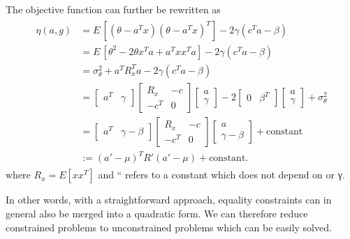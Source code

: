 \documentclass[letterpaper,10pt,english]{jupyterBook}
\begin{document}
\sphinxAtStartPar
The objective function can further be rewritten as
\begin{equation*}
\begin{split} \begin{split} \eta(a,g) & = E\, \left[\left(\theta - a^T
x\right)\left(\theta - a^T x\right)^T\right] - 2 \gamma
\left(c^T a - \beta\right) \\& = E\, \left[\theta^2 - 2\theta
x^T a + a^T xx^T a\right] - 2 \gamma \left(c^T a - \beta\right)
\\& = \sigma_\theta^2 + a^T R_x^T a - 2 \gamma \left(c^T a -
\beta\right) \\& = \begin{bmatrix} a^T & \gamma \end{bmatrix}
\begin{bmatrix} R_x & -c \\ -c^T & 0 \end{bmatrix} \begin{bmatrix}
a \\ \gamma \end{bmatrix} -2 \begin{bmatrix} 0 & \beta^T
\end{bmatrix} \begin{bmatrix} a \\ \gamma \end{bmatrix} +
\sigma_\theta^2 \\& = \begin{bmatrix} a^T & \gamma-\beta
\end{bmatrix} \begin{bmatrix} R_x & -c \\ -c^T & 0 \end{bmatrix}
\begin{bmatrix} a \\ \gamma-\beta \end{bmatrix} + \text{constant}
\\& := (a'-\mu)^T R' (a'-\mu) + \text{constant} . \end{split} \end{split}
\end{equation*}
\sphinxAtStartPar
where  \( R_x = E[xx^T] \) and “ refers to a constant
which does not depend on  or γ.

\sphinxAtStartPar
In other words, with a straightforward approach, equality constraints
can in general also be merged into a quadratic form. We can therefore
reduce constrained problems to unconstrained problems which can be
easily solved.
\end{document}
